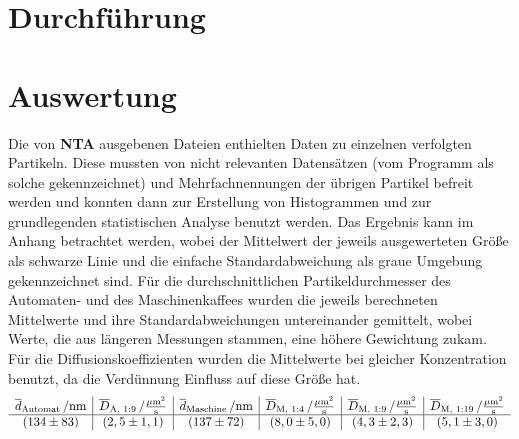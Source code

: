 \documentclass[numbers=noenddot,12pt,a4paper]{scrartcl}
\newcommand{\ix}[1]{_\text{#1}}
\begin{document}
\section{Durchführung}\label{kap:durchf}

\section{Auswertung}
Die von \textbf{NTA} ausgebenen Dateien enthielten Daten zu einzelnen verfolgten Partikeln. Diese mussten von nicht relevanten Datensätzen (vom Programm als solche gekennzeichnet) und Mehrfachnennungen der übrigen Partikel befreit werden und konnten dann zur Erstellung von Histogrammen und zur grundlegenden statistischen Analyse benutzt werden. Das Ergebnis kann im Anhang betrachtet werden, wobei der Mittelwert der jeweils ausgewerteten Größe als schwarze Linie und die einfache Standardabweichung als graue Umgebung gekennzeichnet sind. Für die durchschnittlichen Partikeldurchmesser des Automaten- und des Maschinenkaffees wurden die jeweils berechneten Mittelwerte und ihre Standardabweichungen untereinander gemittelt, wobei Werte, die aus längeren Messungen stammen, eine höhere Gewichtung zukam. Für die Diffusionskoeffizienten wurden die Mittelwerte bei gleicher Konzentration benutzt, da die Verdünnung Einfluss auf diese Größe hat.
\begin{align*}
\begin{array}{c|c|c|c|c|c}
\unit[\overline{d}\ix{Automat}]{/nm}& \unit[\overline{D}\ix{A, 1:9}]{/\frac{\mu m^2}{s}} & \unit[\overline{d}\ix{Maschine}]{/nm} & \unit[\overline{D}\ix{M, 1:4}]{/\frac{\mu m^2}{s}} & \unit[\overline{D}\ix{M, 1:9}]{/\frac{\mu m^2}{s}} & \unit[\overline{D}\ix{M, 1:19}]{/\frac{\mu m^2}{s}} \\
\hline 
\left(134\pm 83\right)	& \left(2,5\pm 1,1 \right) & \left(137\pm 72\right) & \left(8,0\pm 5,0\right) & \left(4,3\pm 2,3\right) & \left(5,1\pm 3,0\right)
\end{array} 
\end{align*}
\end{document}
